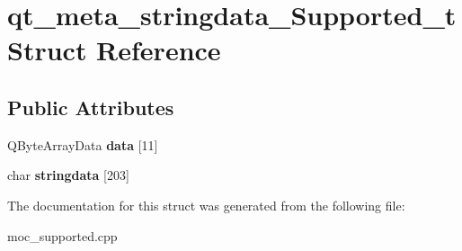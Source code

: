 \hypertarget{structqt__meta__stringdata__Supported__t}{\section{qt\-\_\-meta\-\_\-stringdata\-\_\-\-Supported\-\_\-t Struct Reference}
\label{structqt__meta__stringdata__Supported__t}
}
\subsection*{Public Attributes}
\begin{DoxyCompactItemize}
\item 
\hypertarget{structqt__meta__stringdata__Supported__t_a65e36863fe5fb7d6a69c198bb5b89a6b}{Q\-Byte\-Array\-Data {\bfseries data} \mbox{[}11\mbox{]}}\label{structqt__meta__stringdata__Supported__t_a65e36863fe5fb7d6a69c198bb5b89a6b}

\item 
\hypertarget{structqt__meta__stringdata__Supported__t_ac1cc2814043b1d36a9336982df35f474}{char {\bfseries stringdata} \mbox{[}203\mbox{]}}\label{structqt__meta__stringdata__Supported__t_ac1cc2814043b1d36a9336982df35f474}

\end{DoxyCompactItemize}


The documentation for this struct was generated from the following file\-:\begin{DoxyCompactItemize}
\item 
moc\-\_\-supported.\-cpp\end{DoxyCompactItemize}
